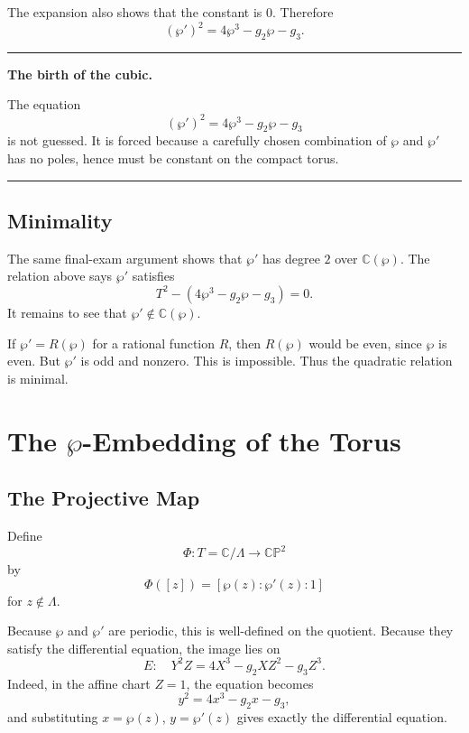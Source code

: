\documentclass[11pt]{article}
\newcommand{\C}{\mathbb{C}}
\newcommand{\CP}{\mathbb{CP}}
\newenvironment{keyidea}[1]{%
  \par\medskip
  \begin{center}
  \begin{minipage}{0.92\textwidth}
  \hrule
  \smallskip
  \textbf{#1.}\quad\ignorespaces
}{%
  \smallskip
  \hrule
  \end{minipage}
  \end{center}
  \medskip
}
\begin{document}
The expansion also shows that the constant is \(0\).  Therefore
\[
\boxed{
(\wp')^2=4\wp^3-g_2\wp-g_3.
}
\]

\begin{keyidea}{The birth of the cubic}
The equation
\[
(\wp')^2=4\wp^3-g_2\wp-g_3
\]
is not guessed.  It is forced because a carefully chosen combination of
\(\wp\) and \(\wp'\) has no poles, hence must be constant on the compact
torus.
\end{keyidea}

\subsection{Minimality}

The same final-exam argument shows that \(\wp'\) has degree \(2\) over
\(\C(\wp)\).  The relation above says \(\wp'\) satisfies
\[
T^2-(4\wp^3-g_2\wp-g_3)=0.
\]
It remains to see that \(\wp'\notin\C(\wp)\).

If \(\wp'=R(\wp)\) for a rational function \(R\), then \(R(\wp)\) would be
even, since \(\wp\) is even.  But \(\wp'\) is odd and nonzero.  This is
impossible.  Thus the quadratic relation is minimal.

\section{The \texorpdfstring{\(\wp\)}{wp}-Embedding of the Torus}

\subsection{The Projective Map}

Define
\[
\Phi:T=\C/\Lambda\longrightarrow\CP^2
\]
by
\[
\Phi([z])=[\wp(z):\wp'(z):1]
\]
for \(z\notin\Lambda\).

Because \(\wp\) and \(\wp'\) are periodic, this is well-defined on the
quotient.  Because they satisfy the differential equation, the image lies on
\[
E:\quad Y^2Z=4X^3-g_2XZ^2-g_3Z^3.
\]
Indeed, in the affine chart \(Z=1\), the equation becomes
\[
y^2=4x^3-g_2x-g_3,
\]
and substituting \(x=\wp(z)\), \(y=\wp'(z)\) gives exactly the differential
equation.
\end{document}
